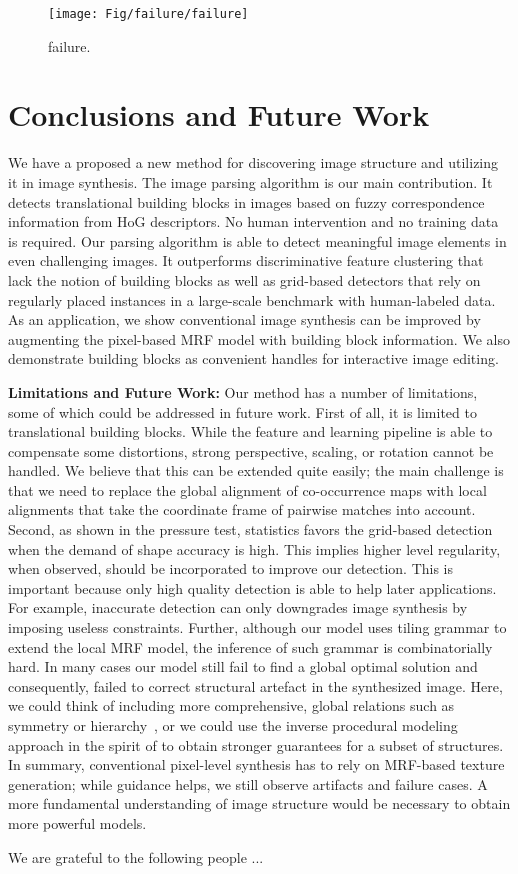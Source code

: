 \documentclass{acmtog}
\begin{document}
\begin{figure*}
	\centering
		\texttt{[image: Fig/failure/failure]}
	\caption{failure.}
	\label{fig:failure} \vspace{-10pt}
\end{figure*}
 

\section{Conclusions and Future Work}

We have a proposed a new method for discovering image structure and utilizing it in image synthesis. The image parsing algorithm is our main contribution. It detects translational building blocks in images based on fuzzy correspondence information from HoG descriptors. No human intervention and no training data is required. Our parsing algorithm is able to detect meaningful image elements in even challenging images. It outperforms discriminative feature clustering that lack the notion of building blocks as well as grid-based detectors that rely on regularly placed instances in a large-scale benchmark with human-labeled data. As an application, we show conventional image synthesis can be improved by augmenting the pixel-based MRF model with building block information. We also demonstrate building blocks as convenient handles for interactive image editing. 

\textbf{Limitations and Future Work:} Our method has a number of limitations, some of which could be addressed in future work. First of all, it is limited to translational building blocks. While the feature and learning pipeline is able to compensate some distortions, strong perspective, scaling, or rotation cannot be handled. We believe that this can be extended quite easily; the main challenge is that we need to replace the global alignment of co-occurrence maps with local alignments that take the coordinate frame of pairwise matches into account. Second, as shown in the pressure test, statistics favors the grid-based detection when the demand of shape accuracy is high. This implies higher level regularity, when observed, should be incorporated to improve our detection. This is important because only high quality detection is able to help later applications. For example, inaccurate detection can only downgrades image synthesis by imposing useless constraints. Further, although our model uses tiling grammar to extend the local MRF model, the inference of such grammar is combinatorially hard. In many cases our model still fail to find a global optimal solution and consequently, failed to correct structural artefact in the synthesized image. Here, we could think of including more comprehensive, global relations such as symmetry or hierarchy~\cite{Hu2013PPI}, or we could use the inverse procedural modeling approach in the spirit of \cite{BOKELOHsig2010,Sylvain2010AT} to obtain stronger guarantees for a subset of structures. In summary, conventional pixel-level synthesis has to rely on MRF-based texture generation; while guidance helps, we still observe artifacts and failure cases. A more fundamental understanding of image structure would be necessary to obtain more powerful models.

\begin{acks}
We are grateful to the following people ... 
\end{acks}





\end{document}
